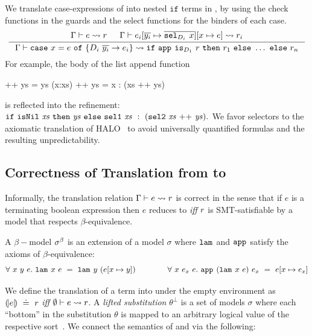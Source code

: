 %
We translate case-expressions
of \corelan into nested $\mathtt{if}$
terms in \smtlan, by using the check
functions in the guards and the
select functions for the binders
of each case.
$$
\inference{
	\tologicshort{\env}{e}{\typ_e}{\pred}{\embed{\typ_e}}{\smtenv}{\axioms} &&
	\tologicshort{\env}{e_i\subst{\overline{y_i}}{\overline{\selector{\dc_i}{}\ x}}\subst{x}{e}}{\typ}{\pred_i}{\embed{\typ}}{\smtenv}{\axioms_i}
}{
	\tologicshort{\env}{\ecase{x}{e}{\dc_i}{\overline{y_i}}{e_i}}{\typ}
	 {\eif{\smtappname{}{}\ \checkdc{\dc_1}\ \pred}{\pred_1}{\ldots} \ \mathtt{else}\ \pred_n}{\embed{\typ}}{\smtenv}
	 {\andaxioms{\axioms}{\axioms_i}}
}%
$$
%
For example, the body of the list append function
%
\begin{code}
    []     ++ ys = ys
    (x:xs) ++ ys = x : (xs ++ ys)
\end{code}
%
is reflected into the \smtlan refinement:
%
$
\texttt{if}\ \mathtt{isNil}\ \mathit{xs}\ \texttt{then}\ \mathit{ys}\ \texttt{else}\ \mathtt{sel1}\ \mathit{xs}\
       :\
       (\mathtt{sel2}\ \mathit{xs} \ \mathtt{++}\  \mathit{ys}).
$
%
We favor selectors to the axiomatic translation of
HALO~\citep{HALO} to avoid universally quantified
formulas and the resulting unpredictability.



\subsection{Correctness of Translation from \corelan to \smtlan}

Informally, the translation relation $ \Gamma\vdash e \rightsquigarrow r $
is correct in the sense that if $e$ is a terminating boolean expression
then $e$ reduces to \etrue \textit{iff} $r$ is SMT-satisfiable
by a model that respects $\beta$-equivalence.

\begin{definition}\label{def:beta-model}
A $\beta-$model $\sigma^\beta$ is an extension of a model $\sigma$
where $\texttt{lam}^{}_{}$ and $\texttt{app}^{}_{}$ satisfy the
axioms of $\beta$-equivalence:
%
$$
\forall\ x\ y\ e.\  \texttt{lam}^{}_{}\ x\ e \ =\ \texttt{lam}^{}_{}\ y\ (e[{{x} \mapsto {y}}])
\quad \quad \quad \quad
\forall\ x\ e_x\ e.\ \texttt{app}^{}_{}\ (\texttt{lam}^{}_{}\ x\ e)\ e_x \ =\   e[{{x} \mapsto {e_x}}]
$$
%
\end{definition}


%
We define the translation of a \corelan term
into \smtlan under the empty environment as
${(\!|e|\!) \ \doteq\  r}$
\textit{iff} ${ \emptyset\vdash e \rightsquigarrow r }$.
%
A \emph{lifted substitution}
$\theta^\perp$ is a set of models $\sigma$
where each ``bottom'' in the substitution
$\theta$ is mapped to an arbitrary logical
value of the respective sort~\citep{Vazou14}.
%
We connect the semantics of \corelan and
\smtlan via the following:

